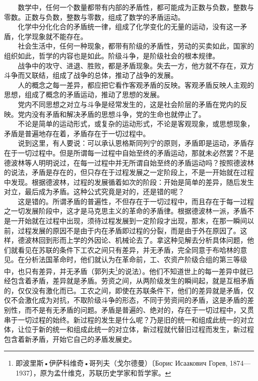 \documentclass[cn,11pt,chinese]{elegantbook}
\begin{document}
　　数学中，任何一个数量都带有内部的矛盾性，都可能成为正数与负数，整数与零数。正数与负数，整数与零数，组成了数学的矛盾运动。\\
　　化学中分化化合的矛盾统一律，组成了化学变化的无量的运动，没有这一矛盾，化学现象就不能存在。\\
　　社会生活中，任何一种现象，都带有阶级的矛盾性，劳动的买卖如此，国家的组织如此，哲学的内容也是如此。阶级斗争，是阶级社会的根本规律。\\
　　战争中的攻守、进退、胜败，都是矛盾现象。失去一方，他方就不存在，双方斗争而又联结，组成了战争的总体，推动了战争的发展。\\
　　人的概念之每一差异，都应把它看作客观矛盾的反映。客观矛盾反映人主观的思想，组成了概念的矛盾运动，推动了思想的发展。\\
　　党内不同思想之对立与斗争是经常发生的，这是社会阶层的矛盾在党内的反映。党内没有矛盾和解决矛盾的思想斗争，党的生命也就停止了。\\
　　不论是简单的运动形式，或复杂的运动形式，不论是客观现象，或思想现象，矛盾是普遍地存在着，矛盾存在于一切过程中。\\
　　说到这里，有人要说：可以承认恩格斯同列宁的原则，矛盾即是运动，矛盾存在于一切过程中。但是所谓每一过程中自始至终的矛盾运动，那就未必然罢？不是德波林等人明明说过，在每一过程中并无所谓自始至终的矛盾运动吗？按照德波林的说法，矛盾是存在的，但只存在于过程发展之一定阶段上，不是一开始就在过程中发现。根据德波林，过程的发展循着如次的阶段：开始是简单的差异，随后发生对立，最后成为矛盾。这种公式究竟是对的，还是错的呢？\\
　　这是错的。所谓矛盾的普遍性，不但存在于一切过程中，而且存在于每一过程之一切发展阶段中，这才是马克思主义的革命的矛盾律。根据德波林一派，矛盾不是一开始就在过程中出现，须待过程发展到一定阶段才出现，那末，在那一瞬间以前，过程发展的原因不是由于内在矛盾即过程的分裂，而是由于外在原因了。这样，德波林回到形而上学的外因论、机械论去了。拿这种见解去分析具体问题，他们就看见在苏联的条件下工农之间只有差异，并无矛盾，完全同意于布哈林的意见。在分析法国革命时，他们就认为在革命前，工、农资产阶级合组的第三等级中，也只有差异，并无矛盾（郭列夫\footnote[6]{ 即波里斯•伊萨科维奇•哥列夫（戈尔德曼）〔Борис Исаакович Горев, 1874—1937〕，原为孟什维克，苏联历史学家和哲学家。}的说法）。他们不知道世上的每一差异中就已经包含着矛盾，差异就是矛盾。劳资之间，从两阶级发生的瞬间起，就是互相矛盾的，仅仅没有激化而已。工农之间，即使在苏联条件下，他们的差异就是矛盾，仅仅不会激化成为对抗，不取阶级斗争的形态，不同于劳资间的矛盾，这是矛盾的差别性，而不是有无矛盾的问题。矛盾是普遍的、绝对的，存在于一切过程中，又贯串于一切过程的始终。新过程的发生是什么呢？乃是旧的统一和组成此统一的对立体，让位于新的统一和组成此统一的对立体，新过程就代替旧过程而发生，新过程包含着新矛盾，开始它自己的矛盾发展史。\\
\end{document}
